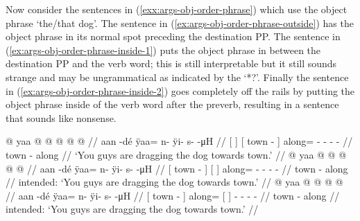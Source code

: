 Now consider the sentences in (\ref{exx:args-obj-order-phrase}) which use the object phrase  ‘the/that dog’. The sentence in (\ref{ex:args-obj-order-phrase-outside}) has the object phrase in its normal spot preceding the destination PP. The sentence in (\ref{ex:args-obj-order-phrase-inside-1}) puts the object phrase in between the destination PP and the verb word; this is still interpretable but it still sounds strange and may be ungrammatical as indicated by the ‘*?’. Finally the sentence in (\ref{ex:args-obj-order-phrase-inside-2}) goes completely off the rails by putting the object phrase inside of the verb word after the preverb, resulting in a sentence that sounds like nonsense.

\pex\label{exx:args-obj-order-phrase}%
\a\label{ex:args-obj-order-phrase-outside}%
%
\begingl
	\gla	{}   {} {}  @ {} {} yaa @  @ {} @ {} @ {} @ {} //
	\glb	{}   {} {} aan -dé {} ÿaa= n- ÿi- s-  -μH //
	\glc	{}[   {}] {}[ town - {}]
			along= - - -  - //
	\gld	{}   {} {} town - {} along  {} {} {} {} {} //
	\glft	‘You guys are dragging the dog towards town.’
		//
\endgl
\a\label{ex:args-obj-order-phrase-inside-1}%
%
%
\begingl
	\gla	{}  @ {} {} {}   {} yaa @  @ {} @ {} @ {} @ {} //
	\glb	{} aan -dé {} {}   {} ÿaa= n- ÿi- s-  -μH //
	\glc	{}[ town - {}] {}[   {}]
			along= - - -  - //
	\gld	{} town - {} {}   {} along  {} {} {} {} {} //
	\glft	intended: ‘You guys are dragging the dog towards town.’
		//
\endgl
\a\label{ex:args-obj-order-phrase-inside-2}%
\ljudge{*}%
%
\begingl
	\gla	{}  @ {} {} yaa {}   {}  @ {} @ {} @ {} @ {} //
	\glb	{} aan -dé {} ÿaa= {}   {} n- ÿi- s-  -μH //
	\glc	{}[ town - {}] along= {}[   {}]
			 - - -  - //
	\gld	{} town - {} along {}   {}  {} {} {} {} {} //
	\glft	intended: ‘You guys are dragging the dog towards town.’
		//
\endgl
\xe

